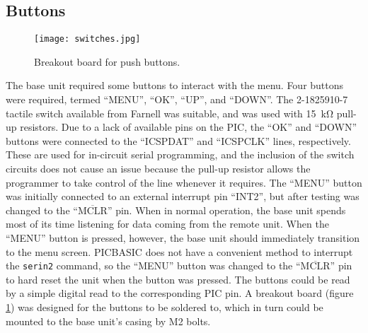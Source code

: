 \subsection{Buttons}
\begin{figure}[htb]
	\centering
	\texttt{[image: switches.jpg]}
	\caption{Breakout board for push buttons.}
	\label{fig: buttons}
\end{figure}

The base unit required some buttons to interact with the menu. Four buttons were required, termed ``MENU'', ``OK'', ``UP'', and ``DOWN''. The 2-1825910-7 tactile switch \cite{buttons} available from Farnell was suitable, and was used with \SI{15}{\kilo\ohm} pull-up resistors. Due to a lack of available pins on the PIC, the ``OK'' and ``DOWN'' buttons were connected to the ``ICSPDAT'' and ``ICSPCLK'' lines, respectively. These are used for in-circuit serial programming, and the inclusion of the switch circuits does not cause an issue because the pull-up resistor allows the programmer to take control of the line whenever it requires. The ``MENU'' button was initially connected to an external interrupt pin ``INT2'', but after testing was changed to the ``$\overline{\text{MCLR}}$'' pin. When in normal operation, the base unit spends most of its time listening for data coming from the remote unit. When the ``MENU'' button is pressed, however, the base unit should immediately transition to the menu screen. PICBASIC does not have a convenient method to interrupt the \verb|serin2| command, so the ``MENU'' button was changed to the ``$\overline{\text{MCLR}}$'' pin to hard reset the unit when the button was pressed. The buttons could be read by a simple digital read to the corresponding PIC pin. A breakout board (figure \ref{fig: buttons}) was designed for the buttons to be soldered to, which in turn could be mounted to the base unit's casing by M2 bolts.









